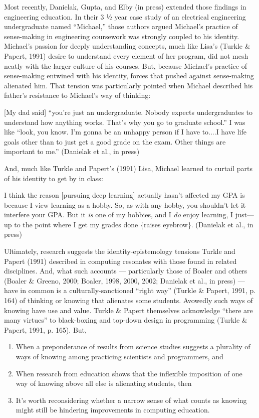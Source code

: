 Most recently, Danielak, Gupta, and Elby (in press) extended those
findings in engineering education. In their 3 ½ year case study of an
electrical engineering undergraduate named ``Michael,'' those authors
argued Michael's practice of sense-making in engineering coursework was
strongly coupled to his identity. Michael's passion for deeply
understanding concepts, much like Lisa's (Turkle \& Papert, 1991) desire
to understand every element of her program, did not mesh neatly with the
larger culture of his courses. But, because Michael's practice of
sense-making entwined with his identity, forces that pushed against
sense-making alienated him. That tension was particularly pointed when
Michael described his father's resistance to Michael's way of thinking:

{[}My dad said{]} ``you're just an undergraduate. Nobody expects
undergraduates to understand how anything works. That's why you go to
graduate school.'' I was like ``look, you know. I'm gonna be an unhappy
person if I have to....I have life goals other than to just get a good
grade on the exam. Other things are important to me.'' (Danielak et al.,
in press)

And, much like Turkle and Papert's (1991) Lisa, Michael learned to
curtail parts of his identity to get by in class:

I think the reason {[}pursuing deep learning{]} actually hasn't affected
my GPA is because I view learning as a hobby. So, as with any hobby, you
shouldn't let it interfere your GPA. But it \emph{is} one of my hobbies,
and I \emph{do} enjoy learning, I just---up to the point where I get my
grades done \{raises eyebrow\}. (Danielak et al., in press)

Ultimately, research suggests the identity-epistemology tensions Turkle
and Papert (1991) described in computing resonates with those found in
related disciplines. And, what such accounts --- particularly those of
Boaler and others (Boaler \& Greeno, 2000; Boaler, 1998, 2000, 2002;
Danielak et al., in press) --- have in common is a culturally-sanctioned
``right way'' (Turkle \& Papert, 1991, p. 164) of thinking or knowing
that alienates some students. Avowedly such ways of knowing have use and
value. Turkle \& Papert themselves acknowledge ``there are many
virtues'' to black-boxing and top-down design in programming (Turkle \&
Papert, 1991, p. 165). But,

\begin{enumerate}
\def\labelenumi{\arabic{enumi}.}
\item
  When a preponderance of results from science studies suggests a
  plurality of ways of knowing among practicing scientists and
  programmers, and
\item
  When research from education shows that the inflexible imposition of
  one way of knowing above all else is alienating students, then
\item
  It's worth reconsidering whether a narrow sense of what counts as
  knowing might still be hindering improvements in computing education.
\end{enumerate}

